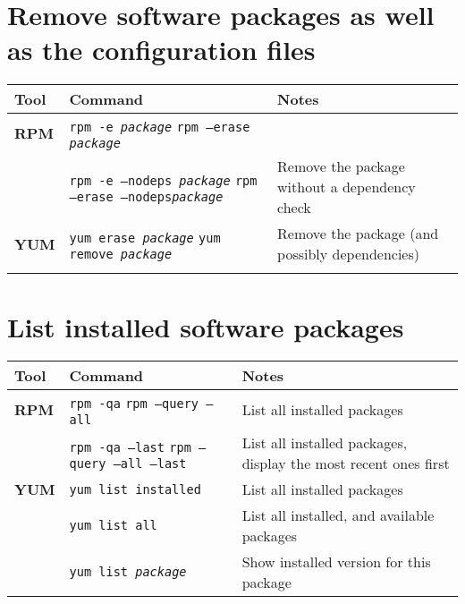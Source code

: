 \documentclass[10pt]{article}
\begin{document}
\section{Remove software packages as well as the configuration files}
\begin{tabular}{ p{3.5cm} p{9cm} p{11cm}}
  \hline
  \rowcolor{Gray}
  \textbf{Tool} & \textbf{Command} & \textbf{Notes} \\
  \hline 
  \textbf{RPM} & \texttt{rpm -e \textit{package}} \newline \texttt{rpm --erase \textit{package}}& \\
  \rowcolor{Gray}
  & \texttt{rpm -e --nodeps \textit{package}} \newline \texttt{rpm --erase  --nodeps\textit{package}} & Remove the package without a dependency check\\
  \textbf{YUM} & \texttt{yum erase \textit{package}} \newline \texttt{yum remove \textit{package}} & Remove the package (and possibly dependencies)\\
  \rowcolor{Gray}
  \hline
\end{tabular}

\newpage

\cheatsheet

\section{List installed software packages}
\begin{tabular}{ p{3.5cm} p{9cm} p{11cm}}
  \hline
  \rowcolor{Gray}
  \textbf{Tool} & \textbf{Command} & \textbf{Notes} \\
  \hline 
  \textbf{RPM} & \texttt{rpm -qa} \newline \texttt{rpm --query --all} & List all installed packages\\
  \rowcolor{Gray}
  & \texttt{rpm -qa --last} \newline \texttt{rpm --query --all --last} & List all installed packages, display the most recent ones first\\
  \textbf{YUM} & \texttt{yum list installed} & List all installed packages\\
  \rowcolor{Gray}
  & \texttt{yum list all} & List all installed, and available packages\\
  & \texttt{yum list \textit{package}} & Show installed version for this package\\
  \hline
\end{tabular}
\end{document}
